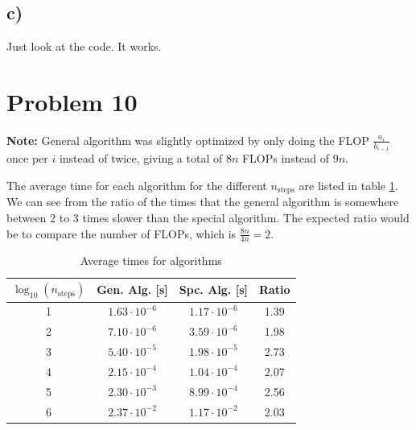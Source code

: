 \documentclass[english,notitlepage]{revtex4-2}  %
\begin{document}
\subsection*{c)}
Just look at the code. It works.

\section*{Problem 10}
\textbf{Note:} General algorithm was slightly optimized by only doing the FLOP $\frac{a_i}{b_{i-1}}$ once per $i$ instead of twice, giving a total of $8n$ FLOPs instead of $9n$.

The average time for each algorithm for the different $n_\text{steps}$ are listed in table \ref{tab:2}. We can see from the ratio of the times that the general algorithm is somewhere between 2 to 3 times slower than the special algorithm. The expected ratio would be to compare the number of FLOPs, which is $\frac{8n}{4n}=2$. 

\begin{table}
	\centering
	\caption{Average times for algorithms}
	\begin{tabular}{c c c c }
		\hline
		$\log_{10}(n_{\text{steps}})$ & Gen. Alg. [s] & Spc. Alg. [s] & Ratio \\
		\hline
		1 & $1.63\cdot10^{-6}$ & $1.17\cdot10^{-6}$ & 1.39\\
		2 & $7.10\cdot10^{-6}$ & $3.59\cdot10^{-6}$ & 1.98\\
		3 & $5.40\cdot10^{-5}$ & $1.98\cdot10^{-5}$ & 2.73\\
		4 & $2.15\cdot10^{-4}$ & $1.04\cdot10^{-4}$ & 2.07\\
		5 & $2.30\cdot10^{-3}$ & $8.99\cdot10^{-4}$ & 2.56\\
		6 & $2.37\cdot10^{-2}$ & $1.17\cdot10^{-2}$ & 2.03\\
		\hline
	\end{tabular}\label{tab:2}
\end{table}
\end{document}
